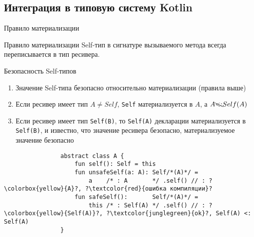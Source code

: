 \documentclass[aspectratio=169,usenames,dvipsnames]{beamer}
\begin{document}
    \subsection{Интеграция в типовую систему Kotlin}

    \begin{frame}[fragile]{Правило материализации}
        \begin{block}{Правило материализации}
            Self-тип в сигнатуре вызываемого метода всегда переписывается в тип ресивера.
        \end{block}
        \begin{block}{Безопасность Self-типов}
            \begin{enumerate}
                \item Значение Self-типа безопасно относительно материализации (правила выше)
                \item Если ресивер имеет тип $A \neq Self$, \texttt{Self} материализуется в $A$, а $A \bcancel{<:} Self(A)$
                \item Если ресивер имеет тип \texttt{Self(B)}, то \texttt{Self(A)} декларации материализуется в \texttt{Self(B)}, и известно, что значение ресивера безопасно, материализуемое значение безопасно
            \end{enumerate}
            \begin{verbatim}
                abstract class A {
                    fun self(): Self = this
                    fun unsafeSelf(a: A): Self/*(A)*/ =
                        a    /* : A       */ .self() // : ?\colorbox{yellow}{A}?, ?\textcolor{red}{ошибка компиляции}?
                    fun safeSelf():       Self/*(A)*/ =
                        this /* : Self(A) */ .self() // : ?\colorbox{yellow}{Self(A)}?, ?\textcolor{junglegreen}{ok}?, Self(A) <: Self(A)
                }
            \end{verbatim}
        \end{block}
    \end{frame}
%
\end{document}
